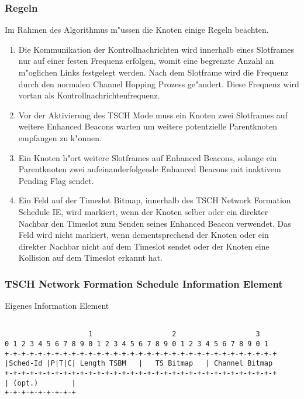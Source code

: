 \subsubsection{Regeln}
\label{subsubsec:di_regeln}
Im Rahmen des Algorithmus m"ussen die Knoten einige Regeln beachten.

\begin{enumerate}
  \item Die Kommunikation der Kontrollnachrichten wird innerhalb eines
  Slotframes nur auf einer festen Frequenz erfolgen, womit eine begrenzte Anzahl
  an m"oglichen Links festgelegt werden. Nach dem Slotframe wird die Frequenz
  durch den normalen Channel Hopping Prozess ge"andert. Diese Frequenz wird vortan
  als Kontrollnachrichtenfrequenz.
  \item Vor der Aktivierung des TSCH Mode muss ein Knoten zwei Slotframes
  auf weitere Enhanced Beacons warten um weitere potentzielle Parentknoten
  empfangen zu k"onnen.
  \item Ein Knoten h"ort weitere Slotframes auf Enhanced Beacons, solange ein
  Parentknoten zwei aufeinanderfolgende Enhanced Beacons mit inaktivem Pending Flag
  sendet.
  \item Ein Feld auf der Timeslot Bitmap, innerhalb des TSCH Network Formation Schedule IE,
  wird markiert, wenn der Knoten selber oder ein direkter Nachbar den Timeslot
  zum Senden seines Enhanced Beacon verwendet. Das Feld wird nicht markiert,
  wenn dementsprechend der Knoten oder ein direkter Nachbar nicht auf dem Timeslot
  sendet oder der Knoten eine Kollision auf dem Timeslot erkannt hat.
\end{enumerate}

\subsubsection{TSCH Network Formation Schedule Information Element}
\label{subsubsec:di_nfsie}

Eigenes Information Element

\begin{lstlisting}[frame=single]

                    1                   2                   3
0 1 2 3 4 5 6 7 8 9 0 1 2 3 4 5 6 7 8 9 0 1 2 3 4 5 6 7 8 9 0 1
+-+-+-+-+-+-+-+-+-+-+-+-+-+-+-+-+-+-+-+-+-+-+-+-+-+-+-+-+-+-+-+-+
|Sched-Id |P|T|C| Length TSBM   |   TS Bitmap   | Channel Bitmap
+-+-+-+-+-+-+-+-+-+-+-+-+-+-+-+-+-+-+-+-+-+-+-+-+-+-+-+-+-+-+-+-+
| (opt.)        |
+-+-+-+-+-+-+-+-+
\end{lstlisting}

